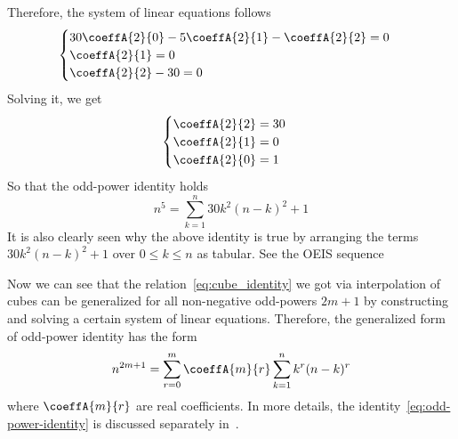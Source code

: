 Therefore, the system of linear equations follows
\begin{equation*}
    \begin{cases}
        30 \coeffA{2}{0} - 5 \coeffA{2}{1} - \coeffA{2}{2} = 0 \\
        \coeffA{2}{1} = 0 \\
        \coeffA{2}{2} - 30 = 0
    \end{cases}
\end{equation*}
Solving it, we get
\begin{equation*}
    \begin{cases}
        \coeffA{2}{2} = 30 \\
        \coeffA{2}{1} = 0 \\
        \coeffA{2}{0} = 1
    \end{cases}
\end{equation*}
So that the odd-power identity holds
\begin{equation*}
    n^5 = \sum_{k=1}^{n} 30k^2(n-k)^2 + 1
\end{equation*}
It is also clearly seen
why the above identity is true by arranging the terms $30k^2(n-k)^2 + 1$ over $0 \leq k \leq n$ as tabular.
See the OEIS sequence~\cite{oeis_numerical_triangle_row_sums_give_fifth_powers}


Now we can see that the relation~\eqref{eq:cube_identity}
we got via interpolation of cubes
can be generalized for all non-negative odd-powers $2m+1$ by constructing
and solving a certain system of linear equations.
Therefore, the generalized form of odd-power identity has the form
\begin{align*}
    n^{2m+1} = \sum_{r=0}^{m} \coeffA{m}{r} \sum_{k=1}^{n} k^{r} (n-k)^{r}
    \label{eq:odd-power-identity}
\end{align*}
where $\coeffA{m}{r}$ are real coefficients.
In more details, the identity~\eqref{eq:odd-power-identity} is discussed
separately in~\cite{unusual_identity_for_odd_powers, polynomial_identity_with_binomial_theorem_and_faulhabers_formula}.


